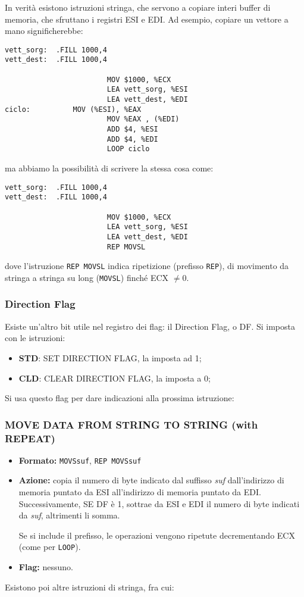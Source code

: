 \documentclass[a4paper,11pt]{article}
\begin{document}
In verità esistono istruzioni stringa, che servono a copiare interi buffer di memoria, che sfruttano i registri ESI e EDI.
Ad esempio, copiare un vettore a mano significherebbe:
\begin{lstlisting}	
vett_sorg:	.FILL 1000,4
vett_dest:	.FILL 1000,4

						MOV $1000, %ECX
						LEA vett_sorg, %ESI
						LEA vett_dest, %EDI
ciclo:			MOV (%ESI), %EAX
						MOV %EAX , (%EDI)
						ADD $4, %ESI
						ADD $4, %EDI
						LOOP ciclo
\end{lstlisting}
ma abbiamo la possibilità di scrivere la stessa cosa come:
\begin{lstlisting}	
vett_sorg:	.FILL 1000,4
vett_dest:	.FILL 1000,4

						MOV $1000, %ECX
						LEA vett_sorg, %ESI
						LEA vett_dest, %EDI
						REP MOVSL
\end{lstlisting}
dove l'istruzione \lstinline|REP MOVSL| indica ripetizione (prefisso \lstinline|REP|), di movimento da stringa a stringa su long (\lstinline|MOVSL|) finché ECX $\neq 0$.

\subsubsection{Direction Flag}
Esiste un'altro bit utile nel registro dei flag: il Direction Flag, o DF.
Si imposta con le istruzioni:
\begin{itemize}
	\item \textbf{\textsf{STD}}: \textsf{SET DIRECTION FLAG}, la imposta ad 1;
	\item \textbf{\textsf{CLD}}: \textsf{CLEAR DIRECTION FLAG}, la imposta a  0;
\end{itemize}

Si usa questo flag per dare indicazioni alla prossima istruzione:

\subsubsection{MOVE DATA FROM STRING TO STRING (with REPEAT)}
\begin{itemize}
	\item \textbf{Formato:} \lstinline|MOVSsuf|, \lstinline|REP MOVSsuf| 
	\item \textbf{Azione:} copia il numero di byte indicato dal suffisso \textit{suf} dall'indirizzo di memoria puntato da ESI all'indirizzo di memoria puntato da EDI.
		Successivamente, SE DF è 1, sottrae da ESI e EDI il numero di byte indicati da \textit{suf}, altrimenti li somma.

		Se si include il prefisso, le operazioni vengono ripetute decrementando ECX (come per \lstinline|LOOP|).
	\item \textbf{Flag:} nessuno.
\end{itemize}
\par\medskip
Esistono poi altre istruzioni di stringa, fra cui:
\end{document}
